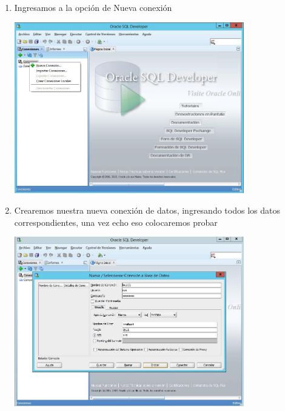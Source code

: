 \begin{enumerate}[1.]
	\hfill \break
	\hfill \break
	\hfill \break
	\hfill \break
	\hfill \break
	\hfill \break
	\hfill \break
	\hfill \break
	\item Ingresamos a la opci\'on de Nueva conexi\'on\\
	\begin{center}
	\includegraphics[width=10cm]{./Imagenes/img26} 
	\end{center}

	\item Crearemos nuestra nueva conexi\'on de datos, ingresando todos los datos correspondientes, una vez echo eso colocaremos probar\\
	\begin{center}
	\includegraphics[width=10cm]{./Imagenes/img27} 
	\end{center}


\end{enumerate}

